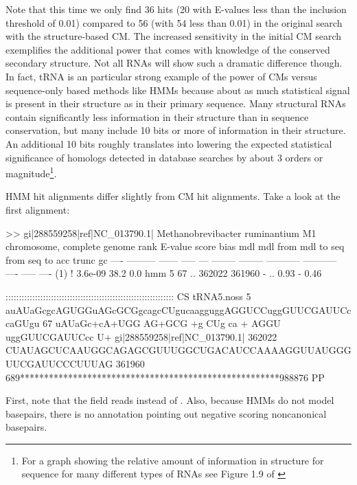 Note that this time we only find 36 hits (20 with E-values less than
the inclusion threshold of 0.01) compared to 56 (with 54 less than
0.01) in the original search with the structure-based CM. The
increased sensitivity in the initial CM search exemplifies the
additional power that comes with knowledge of the conserved secondary
structure. Not all RNAs will show such a dramatic difference
though. In fact, tRNA is an particular strong example of the power of
CMs versus sequence-only based methods like HMMs because about as much
statistical signal is present in their structure as in their primary
sequence. Many structural RNAs contain significantly less information
in their structure than in sequence conservation, but many include 10
bits or more of information in their structure. An additional 10 bits
roughly translates into lowering the expected statistical significance
of homologs detected in database searches by about 3 orders or
magnitude\footnote{For a graph showing the relative amount of
information in structure for sequence for many different types of RNAs
see Figure 1.9 of \citep{Nawrocki09}}.

HMM hit alignments differ slightly from CM hit alignments. Take a look
at the first alignment:

\begin{sreoutput}
>> gi|288559258|ref|NC_013790.1|  Methanobrevibacter ruminantium M1 chromosome, complete genome
 rank     E-value  score  bias mdl mdl from   mdl to       seq from      seq to       acc trunc   gc
 ----   --------- ------ ----- --- -------- --------    ----------- -----------      ---- ----- ----
  (1) !   3.6e-09   38.2   0.0 hmm        5       67 ..      362022      361960 - .. 0.93     - 0.46

                                       ::::::::::::::::::::::::::::::::::::::::::::::::::::::::::::::: CS
                     tRNA5.noss      5 auAUaGcgcAGUGGuAGcGCGgcagcCUgucaagguggAGGUCCuggGUUCGAUUCccaGUgu 67    
                                        uAUaGc+cA+UGG AG+GCG  +g CUg ca  +   AGGU  uggGUUCGAUUCcc  U+ 
  gi|288559258|ref|NC_013790.1| 362022 CUAUAGCUCAAUGGCAGAGCGUUUGGCUGACAUCCAAAAGGUUAUGGGUUCGAUUCCCUUUAG 361960
                                       689******************************************************988876 PP
\end{sreoutput}

First, note that the  field reads  instead of
. Also, because HMMs do not model basepairs, there is no
 annotation pointing out negative scoring noncanonical
basepairs.

